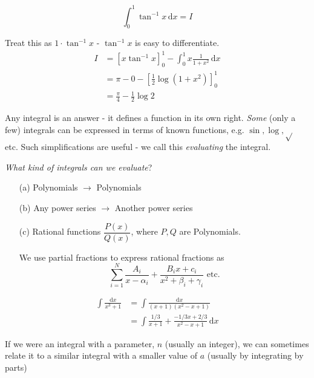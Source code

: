 \documentclass[10pt]{scrartcl}
\begin{document}
\begin{example}
\[\int_0^1 \tan^{-1}x\,\mathrm{d}x = I\]

Treat this as $1\cdot\tan^{-1}x$ - $\tan^{-1}x$ is easy to differentiate. 
\[
\begin{aligned}
  I &= [x\tan^{-1}x]_0^1 - \int_0^1 x \frac{1}{1+x^2}\,\mathrm{d}x\\
  &= \pi-0 - \left[\frac{1}{2}\log(1+x^2)\right]_0^1\\
  &= \frac{\pi}{4} - \frac{1}{2}\log 2
\end{aligned}
\]
\end{example}

\vspace*{5pt}

Any integral is an answer - it defines a function in its own right. \emph{Some} (only a few) integrals can be expressed in terms of known functions, e.g. $\sin, \log, \sqrt{}$ etc. Such simplifications are useful - we call this \emph{evaluating} the integral. 

\emph{What kind of integrals can we evaluate}? 
\begin{itemize}
  \item[(a)] Polynomials $\to$ Polynomials
  \item[(b)] Any power series $\to$ Another power series
  \item[(c)] Rational functions $\dfrac{P(x)}{Q(x)}$, where $P,Q$ are Polynomials. 
  
  We use partial fractions to express rational fractions as 
  \[\sum_{i=1}^N \frac{A_i}{x-\alpha_i} + \frac{B_ix + c_i}{x^2 + \beta_i + \gamma_i}\text{ etc.}\]
\end{itemize}

  \begin{example}
  \[
\begin{aligned}
  \int \frac{\mathrm{d}x}{x^3 + 1} &= \int \frac{\mathrm{d}x}{(x+1)(x^2-x+1)}\\
  &= \int \frac{1/3}{x+1} + \frac{-1/3x + 2/3}{x^2-x+1}\,\mathrm{d}x
\end{aligned}
\]
	
  \end{example}



If we were an integral with a parameter, $n$ (usually an integer), we can sometimes relate it to a similar integral with a smaller value of $a$ (usually by integrating by parts)\\
\end{document}
